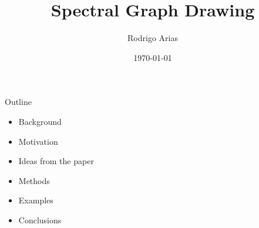 \documentclass[serif, 12pt]{beamer}
\title{Spectral Graph Drawing}
\author{Rodrigo Arias}
\date{\today}
\begin{document}
%

\begin{frame}
	\maketitle
\end{frame}


\begin{frame}{Outline}

\begin{itemize}
\item Background
\item Motivation
\item Ideas from the paper
\item Methods
\item Examples
\item Conclusions
\end{itemize}

\end{frame}
\end{document}
